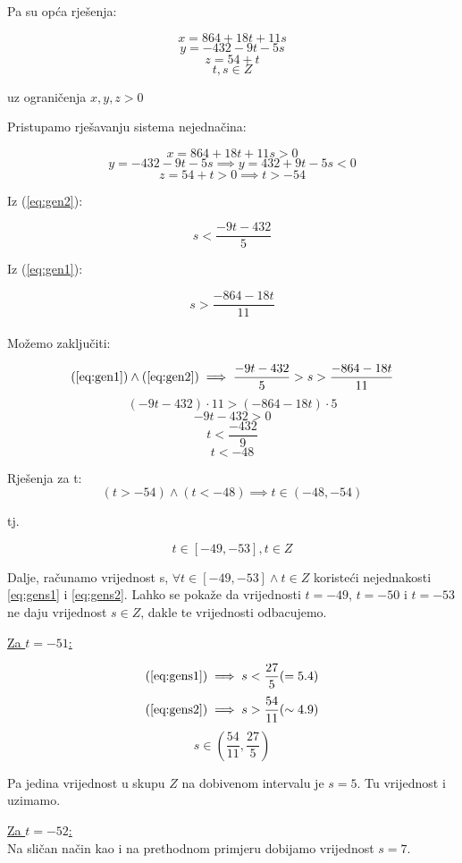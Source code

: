 \documentclass[12pt]{article}
\begin{document}
Pa su opća rješenja:

$$x = 864 + 18t + 11s$$
$$y = -432 - 9t - 5s$$
$$z = 54 + t$$
$$t, s\in Z$$
\begin{center}
uz ograničenja $x, y, z > 0$
\end{center}

Pristupamo rješavanju sistema nejednačina:

\[
x = 864 + 18t + 11s > 0 \label{eq:gen1} \tag{1}
\]
\[
y = -432 - 9t - 5s \implies y = 432 + 9t - 5s < 0 \label{eq:gen2} \tag{2}
\]
$$z = 54 + t > 0 \implies t > - 54$$

Iz (\ref{eq:gen2}):

\[
s < \frac{- 9t - 432}{5} \label{eq:gens1} \tag{A}
\]

Iz (\ref{eq:gen1}):

\[
s > \frac{- 864 - 18t}{11} \label{eq:gens2} \tag{B}
\]\\

Možemo zaključiti:

$$(\ref{eq:gen1}) \land (\ref{eq:gen2}) \implies \frac{- 9t - 432}{5} > s > \frac{- 864 - 18t}{11}$$
$$(- 9t - 432) \cdot 11 > (- 864 - 18t) \cdot 5$$
$$- 9t - 432 > 0$$
$$t < \frac{- 432}{9}$$
$$t < -48$$\vspace{1mm}

Rješenja za t: 
$$(t > -54) \land (t < -48) \implies t\in (-48, -54)$$

tj. 

$$t\in [-49, -53], t\in Z$$\vspace{1mm}

Dalje, računamo vrijednost s, $\forall t\in [-49, -53] \land t\in Z$ koristeći nejednakosti \ref{eq:gens1} i \ref{eq:gens2}. Lahko se pokaže da vrijednosti $t = - 49$, $t = - 50$ i $t = - 53$ ne daju vrijednost $s \in Z$, dakle te vrijednosti odbacujemo.\vspace{1mm}

\underline{Za $t = - 51$:}

$$(\ref{eq:gens1}) \implies s < \frac{27}{5} ( = 5.4)$$
$$(\ref{eq:gens2}) \implies s > \frac{54}{11} ( \sim 4.9)$$
$$s \in (\frac{54}{11}, \frac{27}{5})$$\vspace{1mm}

Pa jedina vrijednost u skupu $Z$ na dobivenom intervalu je $s = 5$. Tu vrijednost i uzimamo.\vspace{1mm}

\underline{Za $t = - 52$:}\\

Na sličan način kao i na prethodnom primjeru dobijamo vrijednost $s = 7$.\vspace{1mm}
\end{document}

